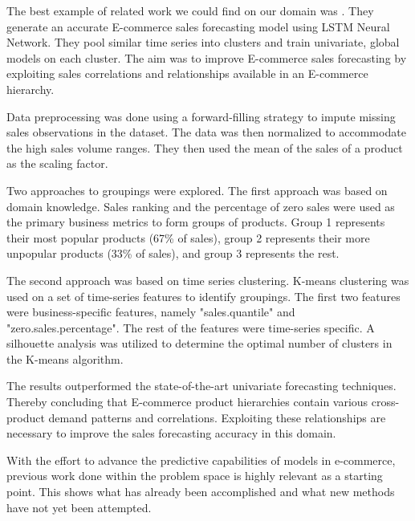 %
%

The best example of related work we could find on our domain was 
\cite{Bandara2019}.
They generate an accurate E-commerce sales forecasting model using LSTM  Neural Network.
They pool similar time series into clusters and train univariate, global models on each cluster.
The aim was to improve E-commerce sales forecasting by exploiting sales correlations and relationships
available in an E-commerce hierarchy.

Data preprocessing was done using a forward-filling strategy to impute missing sales
observations in the dataset.
The data was then normalized to accommodate the high sales volume ranges.
They then used the mean of the sales of a product as the scaling factor.

Two approaches to groupings were explored.
The first approach was based on domain knowledge.
Sales ranking and the percentage of zero sales were used as the primary business metrics
to form groups of products.
Group 1 represents their most popular products (67\% of sales), group 2 represents
their more unpopular products (33\% of sales), and group 3 represents the rest.

The second approach was based on time series clustering.
K-means clustering was used on a set of time-series features to identify groupings.
The first two features were business-specific features, namely "sales.quantile" and "zero.sales.percentage".
The rest of the features were time-series specific.
A silhouette analysis was utilized to determine the optimal number of clusters in the K-means algorithm.

The results outperformed the state-of-the-art univariate forecasting techniques.
Thereby concluding that E-commerce product hierarchies contain various cross-product demand
patterns and correlations.
Exploiting these relationships are necessary to improve the sales forecasting
accuracy in this domain.

With the effort to advance the predictive capabilities of models in e-commerce,
previous work done within the problem space is highly relevant as a starting point.
This shows what has already been accomplished and what new methods have not yet been attempted.


